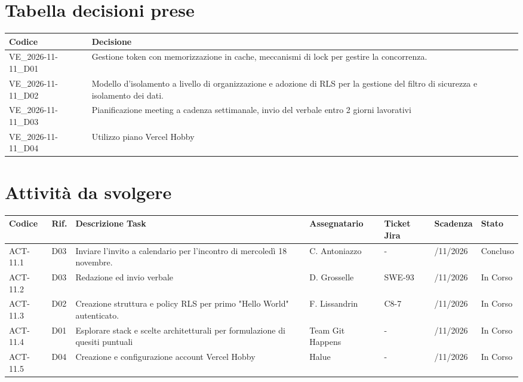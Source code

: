 \newpage

\section{Tabella decisioni prese}

\renewcommand{\arraystretch}{1.3}
\noindent
\begin{tabularx}{\textwidth}{|l|X|}
    \hline
    \textbf{Codice} & \textbf{Decisione} \\
    \hline
    VE\_2026-11-11\_D01 & Gestione token con memorizzazione in cache, meccanismi di lock per gestire la concorrenza. \\
    \hline
    VE\_2026-11-11\_D02 & Modello d'isolamento a livello di organizzazione e adozione di RLS per la gestione del filtro di sicurezza e isolamento dei dati. \\
    \hline
    VE\_2026-11-11\_D03 & Pianificazione meeting a cadenza settimanale, invio del verbale entro 2 giorni lavorativi \\
    \hline
    VE\_2026-11-11\_D04 & Utilizzo piano Vercel Hobby \\
    \hline
\end{tabularx}

\section{Attività da svolgere}

\renewcommand{\arraystretch}{1.3}
\noindent
{\small\setlength{\tabcolsep}{3pt}%
\begin{tabularx}{\textwidth}{|>{\raggedright\arraybackslash}p{1.75cm}|>{\raggedright\arraybackslash}p{0.75cm}|>{\raggedright\arraybackslash}X|>{\raggedright\arraybackslash}p{2.3cm}|>{\raggedright\arraybackslash}p{1.35cm}|>{\raggedright\arraybackslash}p{1.8cm}|>{\raggedright\arraybackslash}p{1.85cm}|}
    \hline
    \textbf{Codice} & \textbf{Rif.} & \textbf{Descrizione Task} & \textbf{Assegnatario} & \textbf{Ticket Jira} & \textbf{Scadenza} & \textbf{Stato} \\
    \hline
    ACT-11.1 & D03 & Inviare l'invito a calendario per l'incontro di mercoledì 18 novembre. & C. Antoniazzo & - & 11/11/2026 & Concluso \\
    \hline
    ACT-11.2 & D03 & Redazione ed invio verbale & D. Grosselle & SWE-93 & 13/11/2026 & In Corso \\
    \hline
    ACT-11.3 & D02 & Creazione struttura e policy RLS per primo "Hello World" autenticato. & F. Lissandrin & C8-7 & 17/11/2026 & In Corso \\
    \hline
    ACT-11.4 & D01 & Esplorare stack e scelte architetturali per formulazione di quesiti puntuali & Team Git Happens & - & 17/11/2026 & In Corso \\
    \hline
    ACT-11.5 & D04 & Creazione e configurazione account Vercel Hobby & Halue & - & 17/11/2026 & In Corso \\
    \hline
\end{tabularx}}